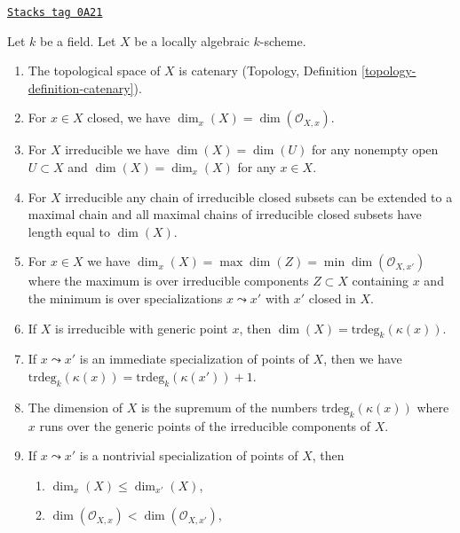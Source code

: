 \begin{lemma}
\label{varieties-lemma-dimension-locally-algebraic}
\href{https://stacks.math.columbia.edu/tag/0A21}{\texttt{Stacks tag 0A21}}

Let $k$ be a field. Let $X$ be a locally algebraic $k$-scheme.
\begin{enumerate}
\item
\label{varieties-item-catenary}
The topological space of $X$ is catenary
(Topology, Definition \ref{topology-definition-catenary}).
\item
\label{varieties-item-dimension-at-closed-point}
For $x \in X$ closed, we have $\dim_x(X) = \dim(\mathcal{O}_{X, x})$.
\item
\label{varieties-item-dimension-irreducible}
For $X$ irreducible we have $\dim(X) = \dim(U)$ for any
nonempty open $U \subset X$ and $\dim(X) = \dim_x(X)$
for any $x \in X$.
\item
\label{varieties-item-irreducible-maximal-chains}
For $X$ irreducible any chain of irreducible closed subsets can be
extended to a maximal chain and all maximal chains of irreducible
closed subsets have length equal to $\dim(X)$.
\item
\label{varieties-item-dimension-irreducibles-passing-through}
For $x \in X$ we have
$\dim_x(X) = \max \dim(Z) = \min \dim(\mathcal{O}_{X, x'})$
where the maximum is over irreducible components
$Z \subset X$ containing $x$ and the minimum is over
specializations $x \leadsto x'$ with $x'$ closed in $X$.
\item
\label{varieties-item-dimension-irreducible-trdeg}
If $X$ is irreducible with generic point $x$, then
$\dim(X) = \text{trdeg}_k(\kappa(x))$.
\item
\label{varieties-item-immediate-specialization}
If $x \leadsto x'$ is an immediate specialization
of points of $X$, then we have
$\text{trdeg}_k(\kappa(x)) = \text{trdeg}_k(\kappa(x')) + 1$.
\item
\label{varieties-item-dimension-sup-trdeg}
The dimension of $X$ is the supremum of the numbers
$\text{trdeg}_k(\kappa(x))$ where $x$ runs over the
generic points of the irreducible components of $X$.
\item
\label{varieties-item-specialization}
If $x \leadsto x'$ is a nontrivial specialization of points of $X$, then
\begin{enumerate}
\item $\dim_x(X) \leq \dim_{x'}(X)$,
\item $\dim(\mathcal{O}_{X, x}) < \dim(\mathcal{O}_{X, x'})$,

\end{enumerate}
\end{enumerate}
\end{lemma}
